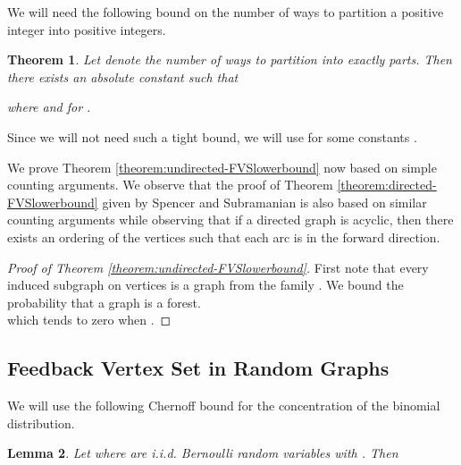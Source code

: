 \documentclass[11pt]{article}
\newtheorem{theorem}{Theorem}
\newtheorem{lemma}[theorem]{Lemma}
\begin{document}
We will need the following bound on the number of ways to partition a positive integer  into  positive integers.
\begin{theorem}\label{theorem:partition-function}\cite{wladimir-partition-function}
Let  denote the number of ways to partition  into exactly  parts. Then there exists an absolute constant  such that

where  and  for .
\end{theorem}
 Since we will not need such a tight bound, we will use  for some constants .

We prove Theorem \ref{theorem:undirected-FVSlowerbound} now based on simple counting arguments. We observe that the proof of Theorem \ref{theorem:directed-FVSlowerbound} given by Spencer and Subramanian is also based on similar counting arguments while observing that if a directed graph is acyclic, then there exists an ordering of the vertices such that each arc is in the forward direction.
\begin{proof}[Proof of Theorem \ref{theorem:undirected-FVSlowerbound}]
First note that every induced subgraph on  vertices is a graph from the family . We bound the probability that a graph  is a forest.\\



which tends to zero when .
\end{proof}

\subsection{Feedback Vertex Set in Random Graphs}
We will use the following Chernoff bound for the concentration of the binomial distribution.
\begin{lemma} \label{lemma:chernoff}
Let  where  are i.i.d. Bernoulli random variables with . Then

\end{lemma}
\end{document}
